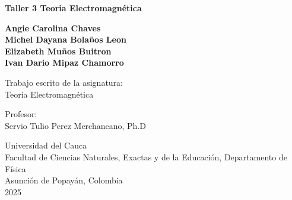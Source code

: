 \begin{titlepage}

    \begin{center}

        {\fontsize{17}{17}\selectfont \textbf{{Taller 3 Teoria Electromagnética }}}
            
        \vfill

        {\textbf{Angie Carolina Chaves\\
        Michel Dayana Bolaños Leon\\
        Elizabeth Muños Buitron\\
        Ivan Dario Mipaz Chamorro\\}
        }
               
        \vfill
        
        {Trabajo  escrito de la asignatura:}\\
        {Teoría Electromagnética}
        
        \vfill
        
        {Profesor:}\\
        {Servio Tulio Perez Merchancano}, {Ph.D}

        
        \vfill

        {Universidad del Cauca}\\
        {Facultad de Ciencias Naturales, Exactas y de la Educación, Departamento de Física}\\
        {Asunción de Popayán, Colombia}\\
        {2025}
        
        \end{center}

\end{titlepage}
